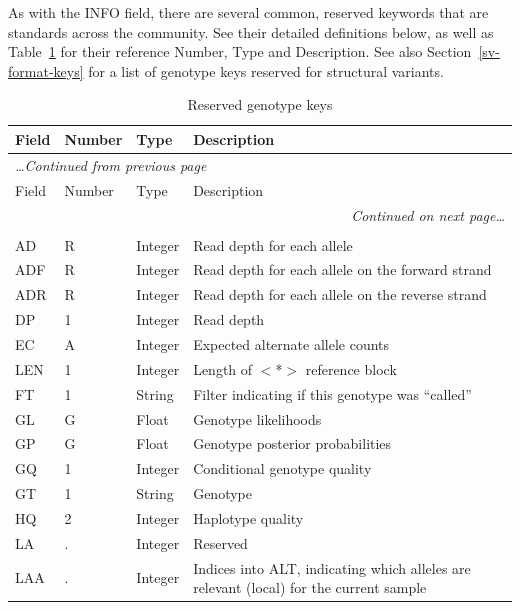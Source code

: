 \documentclass[8pt]{article}
\begin{document}
As with the INFO field, there are several common, reserved keywords that are standards across the community.
See their detailed definitions below, as well as Table~\ref{table:reserved-genotypes} for their reference Number, Type and Description.
See also Section~\ref{sv-format-keys} for a list of genotype keys reserved for structural variants.

\begin{longtable}[c]{ | p{2.5cm} | p{1.5cm} | p{1.5cm} | p{10.3cm} | }
      \hline
      Field		& Number	& Type		& Description \\ \hline
  \endfirsthead
      \multicolumn{4}{l}{\small\emph{\ldots Continued from previous page}} \\[0.7ex]
      \hline
      Field		& Number	& Type		& Description \\ \hline
  \endhead
      \hline
      \multicolumn{4}{r}{\small\emph{Continued on next page\ldots}} \\
      \caption[]{Reserved genotype keys}
  \endfoot
      \hline
      \multicolumn{4}{l}{} \\
      \caption{Reserved genotype keys}
      \label{table:reserved-genotypes}
  \endlastfoot
      AD		& R			& Integer	& Read depth for each allele \\
      ADF		& R			& Integer	& Read depth for each allele on the forward strand \\
      ADR		& R			& Integer	& Read depth for each allele on the reverse strand \\
      DP		& 1			& Integer	& Read depth \\
      EC		& A			& Integer	& Expected alternate allele counts \\
      LEN		& 1			& Integer	& Length of $<$*$>$ reference block \\
      FT		& 1			& String	& Filter indicating if this genotype was ``called'' \\
      GL		& G			& Float		& Genotype likelihoods \\
      GP		& G			& Float		& Genotype posterior probabilities \\
      GQ		& 1			& Integer	& Conditional genotype quality \\
      GT		& 1			& String	& Genotype \\
      HQ		& 2			& Integer	& Haplotype quality \\
      LA		& .			& Integer	& Reserved \\
      LAA		& .			& Integer	& Indices into ALT, indicating which alleles are relevant (local) for the current sample \\

\end{longtable}
\end{document}
